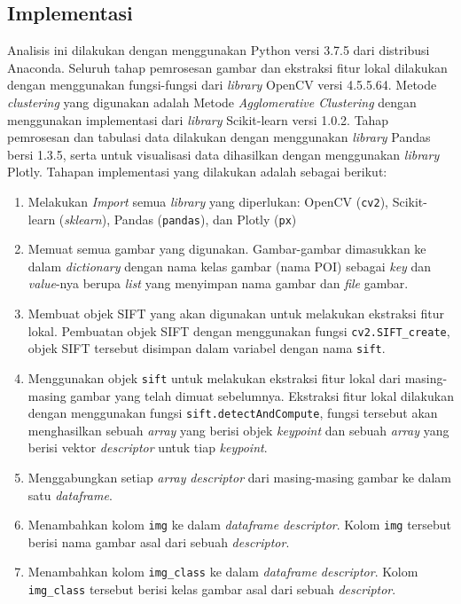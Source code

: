 \subsection{Implementasi}
Analisis ini dilakukan dengan menggunakan Python versi 3.7.5 dari distribusi Anaconda. Seluruh tahap pemrosesan gambar dan ekstraksi fitur lokal dilakukan dengan menggunakan fungsi-fungsi dari \textit{library} OpenCV versi 4.5.5.64. Metode \textit{clustering} yang digunakan adalah Metode \textit{Agglomerative Clustering} dengan menggunakan implementasi dari \textit{library} Scikit-learn versi 1.0.2. Tahap pemrosesan dan tabulasi data dilakukan dengan menggunakan \textit{library} Pandas bersi 1.3.5, serta untuk visualisasi data dihasilkan dengan menggunakan \textit{library} Plotly. Tahapan implementasi yang dilakukan adalah sebagai berikut:
\begin{enumerate}
	\item Melakukan \textit{Import} semua \textit{library} yang diperlukan: OpenCV (\texttt{cv2}), Scikit-learn (\textit{sklearn}), Pandas (\texttt{pandas}), dan Plotly (\texttt{px})
	\item Memuat semua gambar yang digunakan. Gambar-gambar dimasukkan ke dalam \textit{dictionary} dengan nama kelas gambar (nama POI) sebagai \textit{key} dan \textit{value}-nya berupa \textit{list} yang menyimpan nama gambar dan \textit{file} gambar.
	\item Membuat objek SIFT yang akan digunakan untuk melakukan ekstraksi fitur lokal. Pembuatan objek SIFT dengan menggunakan fungsi \texttt{cv2.SIFT\_create}, objek SIFT tersebut disimpan dalam variabel dengan nama \texttt{sift}.
	\item Menggunakan objek \texttt{sift} untuk melakukan ekstraksi fitur lokal dari masing-masing gambar yang telah dimuat sebelumnya. Ekstraksi fitur lokal dilakukan dengan menggunakan fungsi \texttt{sift.detectAndCompute}, fungsi tersebut akan menghasilkan sebuah \textit{array} yang berisi objek \textit{keypoint} dan sebuah \textit{array} yang berisi vektor \textit{descriptor} untuk tiap \textit{keypoint}. 
	\item Menggabungkan setiap \textit{array} \textit{descriptor} dari masing-masing gambar ke dalam satu \textit{dataframe}.
	\item Menambahkan kolom \texttt{img} ke dalam \textit{dataframe} \textit{descriptor}. Kolom \texttt{img} tersebut berisi nama gambar asal dari sebuah \textit{descriptor}.
	\item Menambahkan kolom \texttt{img\_class} ke dalam \textit{dataframe} \textit{descriptor}. Kolom \texttt{img\_class} tersebut berisi kelas gambar asal dari sebuah \textit{descriptor}.

\end{enumerate}
